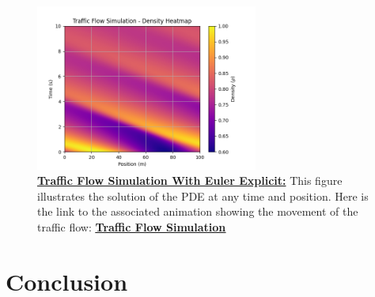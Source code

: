 \documentclass{beamer}
\begin{document}
\begin{frame}
	\begin{figure}[H]
		\centering
		\includegraphics[width=0.65\textwidth]{traffic_flow_density_map_LF.png}
		\caption[Traffic Flow Simulation With Euler Explicit]{\textbf{\underline{Traffic Flow Simulation With Euler Explicit:}} This figure illustrates the solution of the PDE at any time and position. Here is the link to the associated animation showing the movement of the traffic flow: \href{https://github.com/FlorentGerbaud/Simple-road-traffic-modeling/blob/Flo-PDE/SRTM/EDPMethod/CasTestToLaunch/TestToLaunch/Modele_IC_S/LaxFriedrichs/traffic_flow_animation.gif}{\textbf{\underline{Traffic Flow Simulation}}} }
		\label{fig:traffic_flow_density_map}
	\end{figure}
\end{frame}

\section{Conclusion}
\end{document}
